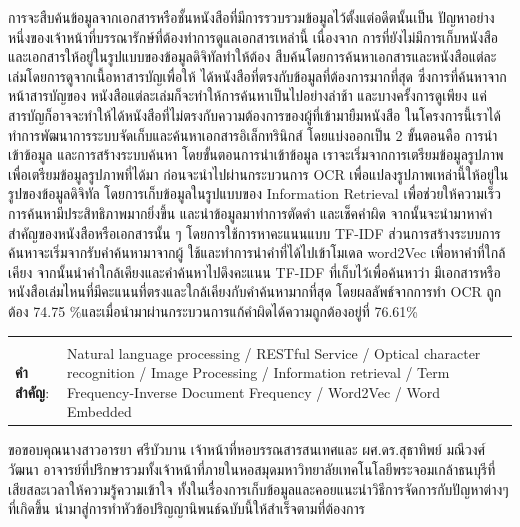 \documentclass[12pt,oneside,openright,a4paper]{cpe-thai-project}
\begin{document}
\thaiabstract

การจะสืบค้นข้อมูลจากเอกสารหรือชั้นหนังสือที่มีการรวบรวมข้อมูลไว้ตั้งแต่อดีตนั้นเป็น
ปัญหาอย่างหนึ่งของเจ้าหน้าที่บรรณารักษ์ที่ต้องทำการดูแลเอกสารเหล่านี้ เนื่องจาก
การที่ยังไม่มีการเก็บหนังสือและเอกสารให้อยู่ในรูปแบบของข้อมูลดิจิทัลทำให้ต้อง
สืบค้นโดยการค้นหาเอกสารและหนังสือแต่ละเล่มโดยการดูจากเนื้อหาสารบัญเพื่อให้
ได้หนังสือที่ตรงกับข้อมูลที่ต้องการมากที่สุด ซึ่งการที่ค้นหาจากหน้าสารบัญของ
หนังสือแต่ละเล่มก็จะทำให้การค้นหาเป็นไปอย่างล่าช้า และบางครั้งการดูเพียง
แค่สารบัญก็อาจจะทำให้ได้หนังสือที่ไม่ตรงกับความต้องการของผู้ที่เข้ามายืมหนังสือ 
ในโครงการนี้เราได้ทำการพัฒนาการระบบจัดเก็บและค้นหาเอกสารอิเล็กทรินิกส์ 
โดยแบ่งออกเป็น 2 ขั้นตอนคือ การนำเข้าข้อมูล  และการสร้างระบบค้นหา 
โดยขั้นตอนการนำเข้าข้อมูล เราจะเริ่มจากการเตรียมข้อมูลรูปภาพ
เพื่อเตรียมข้อมูลรูปภาพที่ได้มา ก่อนจะนำไปผ่านกระบวนการ OCR 
เพื่อแปลงรูปภาพเหล่านี้ให้อยู่ในรูปของข้อมูลดิจิทัล โดยการเก็บข้อมูลในรูปแบบของ 
Information Retrieval เพื่อช่วยให้ความเร็วการค้นหามีประสิทธิภาพมากยิ่งขึ้น 
และนำข้อมูลมาทำการตัดคำ และเช็คคำผิด จากนั้นจะนำมาหาคำสำคัญของหนังสือหรือเอกสารนั้น ๆ
โดยการใช้การหาคะแนนแบบ TF-IDF ส่วนการสร้างระบบการค้นหาจะเริ่มจากรับคำค้นหามาจากผู้
ใช้และทำการนำคำที่ได้ไปเข้าโมเดล word2Vec เพื่อหาคำที่ใกล้เคียง 
จากนั้นนำคำใกล้เคียงและคำค้นหาไปดึงคะแนน TF-IDF ที่เก็บไว้เพื่อค้นหาว่า
มีเอกสารหรือหนังสือเล่มไหนที่มีคะแนนที่ตรงและใกล้เคียงกับคำค้นหามากที่สุด
โดยผลลัพธ์จากการทำ OCR ถูกต้อง 74.75 \%และเมื่อนำมาผ่านกระบวนการแก้คำผิดได้ความถูกต้องอยู่ที่ 76.61\%
\begin{flushleft}
\begin{tabular*}{\textwidth}{@{}lp{}}
 & \\

\textbf{คำสำคัญ}: & Natural language processing / RESTful Service / Optical character recognition / Image Processing / Information retrieval / Term Frequency-Inverse Document Frequency / Word2Vec / Word Embedded 
\end{tabular*}
\end{flushleft}
\endabstract

\preface
ขอขอบคุณนางสาวอารยา ศรีบัวบาน เจ้าหน้าที่หอบรรณสารสนเทศและ ผศ.ดร.สุธาทิพย์ มณีวงศ์วัฒนา อาจารย์ที่ปรึกษารวมทั้งเจ้าหน้าที่ภายในหอสมุดมหาวิทยาลัยเทคโนโลยีพระจอมเกล้าธนบุรีที่เสียสละเวลาให้ความรู้ความเข้าใจ ทั้งในเรื่องการเก็บข้อมูลและคอยแนะนำวิธีการจัดการกับปัญหาต่างๆที่เกิดขึ้น นำมาสู่การทำหัวข้อปริญญานิพนธ์ฉบับนี้ให้สำเร็จตามที่ต้องการ 
\end{document}
